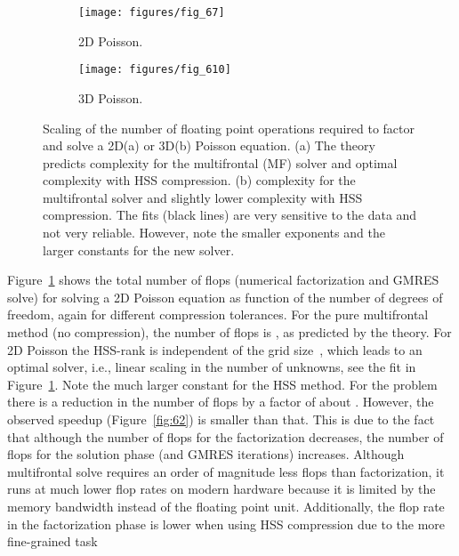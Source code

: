 \documentclass{article}
\begin{document}
\begin{figure}
  \begin{center}
    \begin{subfigure}{.49\textwidth}
      \texttt{[image: figures/fig\_67]}
      \caption{\footnotesize 2D Poisson.}
      \label{fig:67}
    \end{subfigure}
    \begin{subfigure}{.49\textwidth}
      \texttt{[image: figures/fig\_610]}
      \caption{\footnotesize 3D Poisson.}
      \label{fig:610}
    \end{subfigure}
  \end{center}
  \caption{\footnotesize Scaling of the number of floating point operations
    required to factor and solve a 2D(a) or 3D(b) Poisson
    equation. (a) The theory predicts 
    complexity for the multifrontal (MF) solver and optimal
    ~\cite{xia2013randomized} complexity with HSS
    compression. (b)  complexity for the
    multifrontal solver and slightly lower complexity with HSS
    compression. The fits (black lines) are very sensitive to the data
    and not very reliable. However, note the smaller exponents and the
    larger constants for the new solver.}
  \label{fig:Poisson2D3D_scaling}
\end{figure}
Figure~\ref{fig:67} shows the total number of flops (numerical
factorization and GMRES solve) for solving a 2D Poisson equation as
function of the number of degrees of freedom, again for different
compression tolerances. For the pure multifrontal method (no
compression), the number of flops is , as
predicted by the theory. For 2D Poisson the HSS-rank is independent of
the grid size~\cite{chandrasekaran2010numerical}, which leads to an
optimal solver, i.e., linear scaling in the number of unknowns, see
the fit in Figure~\ref{fig:67}.
Note the much larger constant for the HSS method. For the 
problem there is a reduction in the number of flops by a factor of
about . However, the observed speedup (Figure~\ref{fig:62}) is
smaller than that. This is due to the fact that although the number of
flops for the factorization decreases, the number of flops for the
solution phase (and GMRES iterations) increases. Although multifrontal
solve requires an order of magnitude less flops than factorization, it
runs at much lower flop rates on modern hardware because it is limited
by the memory bandwidth instead of the floating point
unit. Additionally, the flop rate in the factorization phase is lower
when using HSS compression due to the more fine-grained task
\end{document}
